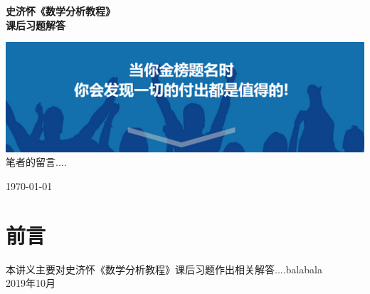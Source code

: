 \documentclass[cs5size]{ctexbook}
\theoremstyle{nonumberplain}%
\theoremstyle{nonumberplain}%
\theoremstyle{nonumberplain}%
\theoremstyle{nonumberplain}%
\theoremstyle{nonumberplain}%
\theoremstyle{plain}
\newcommand{\myTitlePage}{
	\begin{center}
		{
			\LARGE \textbf{史济怀《数学分析教程》}
			\\
			\vspace*{0.5em}
			\textbf{课后习题解答}\\
		}
		
		\vspace{2 cm}
		{
			\includegraphics[scale=0.6]{4.png}
			\\
			\vspace*{0.5em}
			笔者的留言....\\
		}
	
		\vspace{7 cm}
		{
			
			\huge \scshape %
			\today
		}
	\end{center}
}
\begin{document}
	\myTitlePage
	\tableofcontents
	
	\chapter*{前言}
	
	\bigskip
	本讲义主要对史济怀《数学分析教程》课后习题作出相关解答....balabala\\[10pt]
	\null\hfill                                                                2019年10月\\\\
%	
	
	
	
	
	
	
	
	
	
	
	
	
	
	
	
	
	
	
	
	
	
\end{document}
